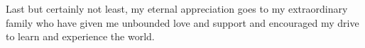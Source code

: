 Last but certainly not least, my eternal appreciation goes to my extraordinary family who have given me unbounded love and support and encouraged my drive to learn and experience the world.


\begin{comment}
\end{comment}
